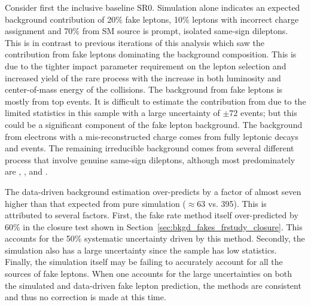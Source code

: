 \clearpage
\begin{table}[!hbt]
\begin{center}
\caption[High \pt baseline yields and predictions with two or more b-tagged jets (Signal Region 20)]
{\label{tab:yield_excl_hpt_sr20}\footnotesize{
\exclhptnamerTWOZERO
\exclhptcutsrTWOZERO
\exclcaption
}
}
\end{center} 
\resizebox{0.67\textwidth}{!}{\begin{minipage}{\textwidth}

\end{minipage} 
}
\end{table}
\clearpage

Consider first the inclusive baseline SR0. Simulation alone indicates an expected
background contribution of 20\% fake leptons, 10\% leptons with incorrect
charge assignment and 70\% from SM source is prompt, isolated same-sign
dileptons.  This is in contrast to previous iterations of this analysis which
saw the contribution from fake leptons dominating the background composition.
This is due to the tighter impact parameter requirement on the lepton selection
and increased yield of the rare process with the increase in both luminosity
and center-of-mass energy of the collisions. The background from fake leptons
is mostly from top events. It is difficult to estimate the contribution from
\Wj due to the limited statistics in this sample with a large uncertainty of
$\pm72$ events; but this could be a significant component of the fake lepton
background. The background from electrons with a mis-reconstructed charge comes
from fully leptonic \ttbar decays and \DY events. The remaining irreducible
background comes from several different process that involve genuine same-sign
dileptons, although most predominately are \ttW, \WZ, and \qqWW.

The data-driven background estimation over-predicts by a factor of almost
seven higher than that expected from pure simulation ($\approx 63$ vs.
395). This is attributed to several factors. First, the fake rate
method itself over-predicted by 60\% in the \ttbar closure test shown in
Section~\ref{sec:bkgd_fakes_frstudy_closure}. This accounts for the 50\%
systematic uncertainty driven by this method. Secondly, the simulation also
has a large uncertainty since the \Wj sample has low statistics. Finally,
the simulation itself may be failing to accurately account for all the sources
of fake leptons. When one accounts for the large uncertainties on both the
simulated and data-driven fake lepton prediction, the methods are
consistent and thus no correction is made at this time.


